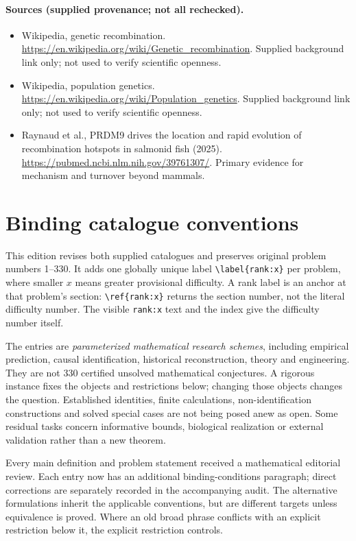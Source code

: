 \documentclass[11pt]{article}
\begin{document}
\paragraph{Sources (supplied provenance; not all rechecked).}
\begin{itemize}
\item Wikipedia, genetic recombination. \url{https://en.wikipedia.org/wiki/Genetic_recombination}. Supplied background link only; not used to verify scientific openness.
\item Wikipedia, population genetics. \url{https://en.wikipedia.org/wiki/Population_genetics}. Supplied background link only; not used to verify scientific openness.
\item Raynaud et al., PRDM9 drives the location and rapid evolution of recombination hotspots in salmonid fish (2025). \url{https://pubmed.ncbi.nlm.nih.gov/39761307/}. Primary evidence for mechanism and turnover beyond mammals.
\end{itemize}


\section*{Binding catalogue conventions}
This edition revises both supplied catalogues and preserves original problem numbers 1--330. It adds one globally unique label \verb|\label{rank:x}| per problem, where smaller $x$ means greater provisional difficulty. A rank label is an anchor at that problem's section: \verb|\ref{rank:x}| returns the section number, not the literal difficulty number. The visible \texttt{rank:x} text and the index give the difficulty number itself.

The entries are \emph{parameterized mathematical research schemes}, including empirical prediction, causal identification, historical reconstruction, theory and engineering. They are not 330 certified unsolved mathematical conjectures. A rigorous instance fixes the objects and restrictions below; changing those objects changes the question. Established identities, finite calculations, non-identification constructions and solved special cases are not being posed anew as open. Some residual tasks concern informative bounds, biological realization or external validation rather than a new theorem.

Every main definition and problem statement received a mathematical editorial review. Each entry now has an additional binding-conditions paragraph; direct corrections are separately recorded in the accompanying audit. The alternative formulations inherit the applicable conventions, but are different targets unless equivalence is proved. Where an old broad phrase conflicts with an explicit restriction below it, the explicit restriction controls.
\end{document}
